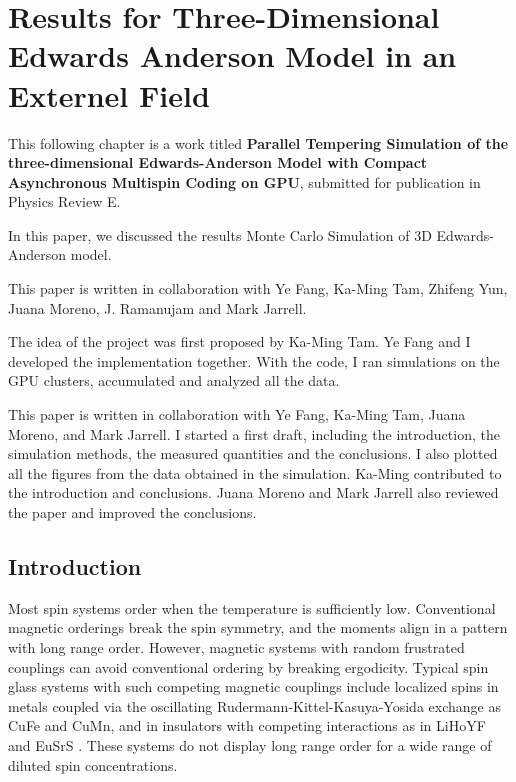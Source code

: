 \chapter{Results for Three-Dimensional Edwards Anderson Model in 
an Externel Field}
\label{chap:sg_result}
This following chapter is a work titled {\bf Parallel Tempering Simulation of 
the three-dimensional Edwards-Anderson Model  with  Compact Asynchronous 
Multispin Coding on GPU}, submitted for publication in Physics Review E.

In this paper, we discussed the results Monte Carlo
Simulation of 3D Edwards-Anderson model.

This paper is written in collaboration with Ye Fang, Ka-Ming Tam, Zhifeng Yun, 
Juana Moreno, J. Ramanujam and Mark Jarrell. 

The idea of the project was first proposed by Ka-Ming Tam. 
Ye Fang and I developed the implementation together. With the code, I ran simulations
on the GPU clusters, accumulated and analyzed all the data. 

This paper is written in collaboration with Ye Fang, Ka-Ming Tam, Juana Moreno, 
and Mark Jarrell. I started a first draft, including the introduction, the 
simulation methods, the measured quantities and the conclusions. I also plotted 
all the figures from the data obtained in the simulation. 
Ka-Ming contributed to the introduction and conclusions. Juana Moreno
and Mark Jarrell also reviewed the paper and improved the conclusions.


\section{Introduction} 
Most spin systems order when the temperature is sufficiently low. 
Conventional magnetic orderings break the spin symmetry, and the moments align 
in a pattern with long range order. However, magnetic 
systems with random frustrated couplings can avoid conventional 
ordering by breaking ergodicity. Typical spin glass systems with 
such competing magnetic couplings include localized spins in metals coupled 
via the oscillating Rudermann-Kittel-Kasuya-Yosida 
exchange as CuFe and CuMn, and in insulators with competing interactions 
as in LiHoYF and EuSrS \cite{Binder-Young-1986,Mydosh-1993,Diep-2004}. These 
systems do not display long range order for a wide range of diluted spin 
concentrations.

